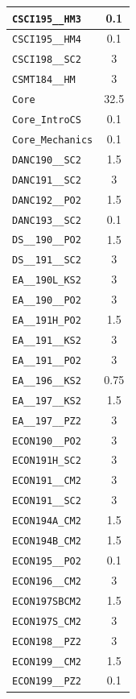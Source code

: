 \begin{longtable}{|p{}|c|}
    \verb|CSCI195__HM3| & 0.1\\\hline
    \verb|CSCI195__HM4| & 0.1\\\hline
    \verb|CSCI198__SC2| & 3\\\hline
    \verb|CSMT184__HM| & 3\\\hline
    \verb|Core| & 32.5\\\hline
    \verb|Core_IntroCS| & 0.1\\\hline
    \verb|Core_Mechanics| & 0.1\\\hline
    \verb|DANC190__SC2| & 1.5\\\hline
    \verb|DANC191__SC2| & 3\\\hline
    \verb|DANC192__PO2| & 1.5\\\hline
    \verb|DANC193__SC2| & 0.1\\\hline
    \verb|DS__190__PO2| & 1.5\\\hline
    \verb|DS__191__SC2| & 3\\\hline
    \verb|EA__190L_KS2| & 3\\\hline
    \verb|EA__190__PO2| & 3\\\hline
    \verb|EA__191H_PO2| & 1.5\\\hline
    \verb|EA__191__KS2| & 3\\\hline
    \verb|EA__191__PO2| & 3\\\hline
    \verb|EA__196__KS2| & 0.75\\\hline
    \verb|EA__197__KS2| & 1.5\\\hline
    \verb|EA__197__PZ2| & 3\\\hline
    \verb|ECON190__PO2| & 3\\\hline
    \verb|ECON191H_SC2| & 3\\\hline
    \verb|ECON191__CM2| & 3\\\hline
    \verb|ECON191__SC2| & 3\\\hline
    \verb|ECON194A_CM2| & 1.5\\\hline
    \verb|ECON194B_CM2| & 1.5\\\hline
    \verb|ECON195__PO2| & 0.1\\\hline
    \verb|ECON196__CM2| & 3\\\hline
    \verb|ECON197SBCM2| & 1.5\\\hline
    \verb|ECON197S_CM2| & 3\\\hline
    \verb|ECON198__PZ2| & 3\\\hline
    \verb|ECON199__CM2| & 1.5\\\hline
    \verb|ECON199__PZ2| & 0.1\\\hline

\end{longtable}
